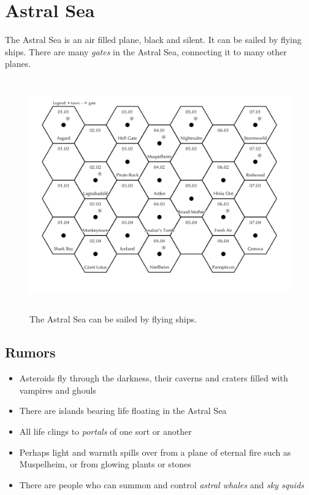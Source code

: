 \documentclass[11pt]{bxart}
\begin{document}
\section{Astral Sea}

The Astral Sea is an air filled plane, black and silent. It can be
sailed by flying ships. There are many \textit{gates} in the Astral
Sea, connecting it to many other planes.

\begin{figure}
  \centering
  \includegraphics[height=10cm]{Astral-Sea.jpg}
  \caption{The Astral Sea can be sailed by flying ships.}
\end{figure}

\subsection{Rumors}

\begin{itemize}
\item Asteroids fly through the darkness, their caverns and craters
  filled with vampires and ghouls
\item There are islands bearing life floating in the Astral Sea
\item All life clings to \textit{portals} of one sort or another
\item Perhaps light and warmth spills over from a plane of eternal
  fire such as Muspelheim, or from glowing plants or stones
\item There are people who can summon and control \textit{astral
  whales} and \textit{sky squids}
\end{itemize}
\end{document}
